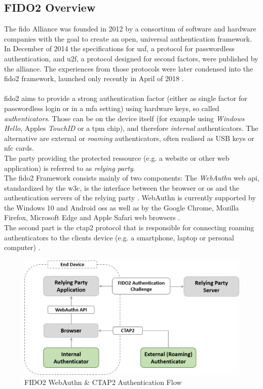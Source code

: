 \subsection{FIDO2 Overview}
\label{subsec:fido2_webauthn}

The \ac{fido} Alliance was founded in 2012 by a consortium of software and hardware companies with the goal to create an open, universal authentication framework. In December of 2014 the specifications for \acl{uaf}, a protocol for passwordless authentication, and \acl{u2f}, a protocol designed for second factors, were published by the alliance. The experiences from those protocols were later condensed into the \ac{fido2} framework, launched only recently in April of 2018 \cite{fido_history}.\\
\\
\ac{fido2} aims to provide a strong authentication factor (either as single factor for passwordless login or in a \ac{mfa} setting) using hardware keys, so called \emph{authenticators}. Those can be on the device itself (for example using \emph{Windows Hello}, Apples \emph{TouchID} or a \ac{tpm} chip), and therefore \emph{internal} authenticators. The alternative are external or \emph{roaming} authenticators, often realised as USB keys or \ac{nfc} cards.\\
The party providing the protected ressource (e.g. a website or other web application) is referred to as \emph{relying party}.\\
The \ac{fido2} Framework consists mainly of two components: The \emph{WebAuthn} web \ac{api}, standardized by the \ac{w3c}, is the interface between the browser or \ac{os} and the authentication servers of the relying party \cite{webauthn_standard}. WebAuthn is currently supported by the Windows 10 and Android \acp{os} as well as by the Google Chrome, Mozilla Firefox, Microsoft Edge and Apple Safari web browsers \cite{fido2_webauthn}.\\
The second part is the \ac{ctap2} protocol that is responsible for connecting roaming authenticators to the clients device (e.g. a smartphone, laptop or personal computer) \cite{fido2_overview,fido2_ctap}.\\

\begin{figure}[ht]
    \centering
    \includegraphics[width=1.8\columnwidth]{Figures/fido2_webauth_ctap_flow.png}
    \caption[FIDO2 Authentication Flow]{FIDO2 WebAuthn \& CTAP2 Authentication Flow}
    \label{fig:fido2_webauth_ctap_flow}
\end{figure}

